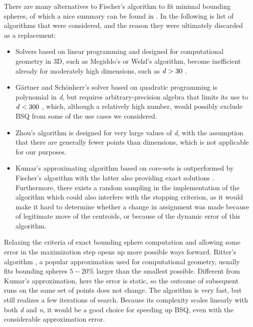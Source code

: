 			There are many alternatives to Fischer's algorithm to fit minimal bounding spheres, of which a nice summary can be found in \cite{sebsum}.
			In the following is list of algorithms that were considered, and the reason they were ultimately discarded as a replacement:
			\begin{itemize}
				\item Solvers based on linear programming and designed for computational geometry in 3D, such as Megiddo's \cite{megiddo} or Welzl's \cite{welzl} algorithm, become inefficient already for moderately high dimensions, such as $\text{\textit{d}}>30$ \cite{fischer}.
				
				\item G\"{a}rtner and Sch\"{o}nherr's \cite{gartner} solver based on quadratic programming is polynomial in \textit{d}, but requires arbitrary-precision algebra that limits its use to $\text{\textit{d}}<300$ \cite{fischer}, which, although a relatively high number, would possibly exclude \ac{BSQ} from some of the use cases we considered.
				
				\item Zhou's algorithm \cite{zhou} is designed for very large values of \textit{d}, with the assumption that there are generally fewer points than dimensions, which is not applicable for our purposes.
				
				\item Kumar's approximating algorithm \cite{kumar} based on core-sets is outperformed by Fischer's algorithm with the latter also providing exact solutions \cite{fischer}.
				Furthermore, there exists a random sampling in the implementation of the algorithm which could also interfere with the stopping criterion, as it would make it hard to determine whether a change in assignment was made because of legitimate move of the centroids, or because of the dynamic error of this algorithm.
			\end{itemize}
			
			Relaxing the criteria of exact bounding sphere computation and allowing some error in the maximization step opens up more possible ways forward.
			Ritter's algorithm \cite{ritter}, a popular approximation used for computational geometry, usually fits bounding spheres $5-20\text{\%}$ larger than the smallest possible.
			Different from Kumar's approximation, here the error is static, so the outcome of subsequent runs on the same set of points does not change.
			The algorithm is very fast, but still realizes a few iterations of search.
			Because its complexity scales linearly with both \textit{d} and \textit{n}, it would be a good choice for speeding up \ac{BSQ}, even with the considerable approximation error. 
			
